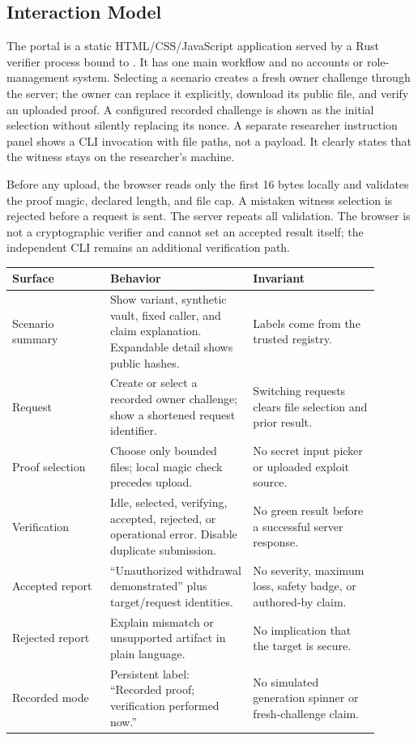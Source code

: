\documentclass[11pt]{article}
\begin{document}
\subsection{Interaction Model}
The portal is a static HTML/CSS/JavaScript application served by a Rust verifier process bound to . It has one main workflow and no accounts or role-management system. Selecting a scenario creates a fresh owner challenge through the server; the owner can replace it explicitly, download its public file, and verify an uploaded proof. A configured recorded challenge is shown as the initial selection without silently replacing its nonce. A separate researcher instruction panel shows a CLI invocation with file paths, not a payload. It clearly states that the witness stays on the researcher's machine.

Before any upload, the browser reads only the first 16 bytes locally and validates the proof magic, declared length, and file cap. A mistaken witness selection is rejected before a request is sent. The server repeats all validation. The browser is not a cryptographic verifier and cannot set an accepted result itself; the independent CLI remains an additional verification path.

\begin{longtable}{L{0.24\linewidth}L{0.35\linewidth}L{0.31\linewidth}}
\toprule
\textbf{Surface} & \textbf{Behavior} & \textbf{Invariant} \\
\midrule
\endhead
Scenario summary & Show variant, synthetic vault, fixed caller, and claim explanation. Expandable detail shows public hashes. & Labels come from the trusted registry. \\
Request & Create or select a recorded owner challenge; show a shortened request identifier. & Switching requests clears file selection and prior result. \\
Proof selection & Choose only bounded  files; local magic check precedes upload. & No secret input picker or uploaded exploit source. \\
Verification & Idle, selected, verifying, accepted, rejected, or operational error. Disable duplicate submission. & No green result before a successful server response. \\
Accepted report & ``Unauthorized withdrawal demonstrated'' plus target/request identities. & No severity, maximum loss, safety badge, or authored-by claim. \\
Rejected report & Explain mismatch or unsupported artifact in plain language. & No implication that the target is secure. \\
Recorded mode & Persistent label: ``Recorded proof; verification performed now.'' & No simulated generation spinner or fresh-challenge claim. \\
\bottomrule
\end{longtable}
\end{document}
